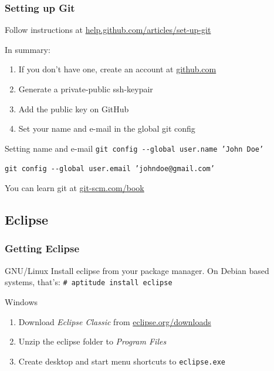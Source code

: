 \documentclass{beamer}
\begin{document}
\begin{frame}[<+->]
  \frametitle{Setting up Git}
  Follow instructions at \href{https://help.github.com/articles/set-up-git}{help.github.com/articles/set-up-git}

  In summary:\pause
  \begin{enumerate}
  \item If you don't have one, create an account at \href{http://github.com}{github.com}
  \item Generate a private-public ssh-keypair
  \item Add the public key on GitHub
  \item Set your name and e-mail in the global git config
  \end{enumerate}
  \begin{block}{Setting name and e-mail}
  \texttt{git config \--\--global user.name 'John Doe'}

  \texttt{git config \--\--global user.email 'johndoe@gmail.com'}
  \end{block}\pause
  You can learn git at \href{http://git-scm.com/book}{git-scm.com/book}
\end{frame}

\subsection{Eclipse}
\begin{frame}[<+->]
  \frametitle{Getting Eclipse}
  \begin{block}{GNU/Linux}
  Install eclipse from your package manager. On Debian based systems, that's: \texttt{\# aptitude install eclipse}
  \end{block}
  \begin{block}{Windows}
  \begin{enumerate}
    \item Download \emph{Eclipse Classic} from \href{http://www.eclipse.org/downloads/}{eclipse.org/downloads}
    \item Unzip the eclipse folder to \textit{Program Files}
    \item Create desktop and start menu shortcuts to \texttt{eclipse.exe}
  \end{enumerate}
  \end{block}
\end{frame}
\end{document}
